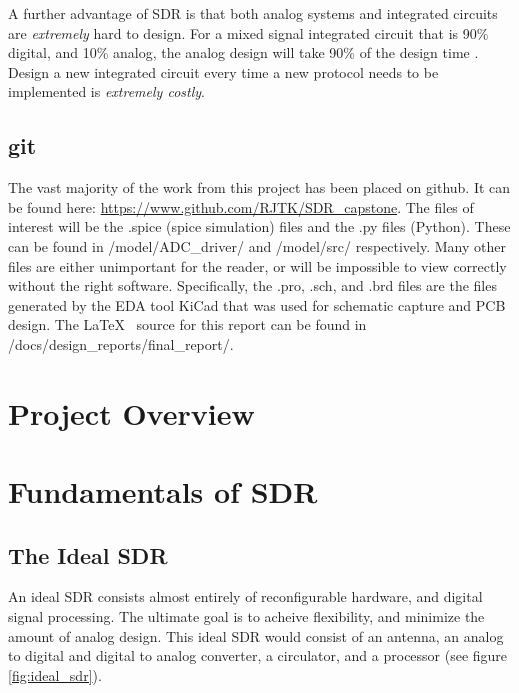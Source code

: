 \documentclass[a4paper, 12pt]{article}
\begin{document}
A further advantage of SDR is that both analog systems and integrated circuits are \textit{extremely} hard to design.  For a mixed signal integrated circuit that is 90\% digital, and 10\% analog, the analog design will take 90\% of the design time \cite{ana_why}.  Design a new integrated circuit every time a new protocol needs to be implemented is \textit{extremely costly}.

\subsection{git}
The vast majority of the work from this project has been placed on github.  It can be found here: \url{https://www.github.com/RJTK/SDR_capstone}.  The files of interest will be the .spice (spice simulation) files and the .py files (Python).  These can be found in /model/ADC\_driver/ and /model/src/ respectively.  Many other files are either unimportant for the reader, or will be impossible to view correctly without the right software.   Specifically, the .pro, .sch, and .brd files are the files generated by the EDA tool KiCad \cite{kicad} that was used for schematic capture and PCB design.  The \LaTeX~ source for this report can be found in /docs/design\_reports/final\_report/.


\section{Project Overview}


\section{Fundamentals of SDR}
\label{sec:sdr_funadamentals}
\subsection{The Ideal SDR}
\label{sec:ideal_sdr}
An ideal SDR consists almost entirely of reconfigurable hardware, and digital signal processing. The ultimate goal is to acheive flexibility, and minimize the amount of analog design.  This ideal SDR would consist of an antenna, an analog to digital and digital to analog converter, a circulator, and a processor (see figure \ref{fig:ideal_sdr}).

\end{document}
